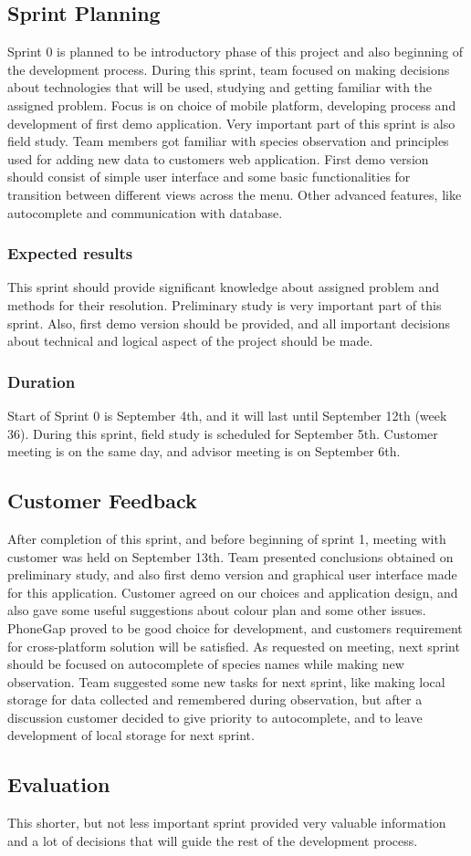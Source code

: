 \subsection{Sprint Planning}
	Sprint 0 is planned to be introductory phase of this project and also beginning of the development process. During this sprint, team focused on making decisions about technologies that will be used, studying and getting familiar with the assigned problem. Focus is on choice of mobile platform, developing process and development of first demo application. Very important part of this sprint is also field study. Team members got familiar with species observation and principles used for adding new data to customers web application. First demo version should consist of simple user interface and some basic functionalities for transition between different views across the menu. Other advanced features, like autocomplete and communication with database.
	
	\subsubsection{Expected results}
	This sprint should provide significant knowledge about assigned problem and methods for their resolution. Preliminary study is very important part of this sprint. Also, first demo version should be provided, and all important decisions about technical and logical aspect of the project should be made.
	
	\subsubsection{Duration}
	Start of Sprint 0 is September 4th, and it will last until September 12th (week 36). During this sprint, field study is scheduled for September 5th. Customer meeting is on the same day, and advisor meeting is on September 6th.
	
	
	
\subsection{Customer Feedback}
	After completion of this sprint, and before beginning of sprint 1, meeting with customer was held on September 13th. Team presented conclusions obtained on preliminary study, and also first demo version and graphical user interface made for this application. Customer agreed on our choices and application design, and also gave some useful suggestions about colour plan and some other issues. PhoneGap proved to be good choice for development, and customers requirement for cross-platform solution will be satisfied. As requested on meeting, next sprint should be focused on autocomplete of species names while making new observation. Team suggested some new tasks for next sprint, like making local storage for data collected and remembered during observation, but after a discussion customer decided to give priority to autocomplete, and to leave development of local storage for next sprint.
	
\subsection{Evaluation}
	This shorter, but not less important sprint provided very valuable information and a lot of decisions that will guide the rest of the development process. 
